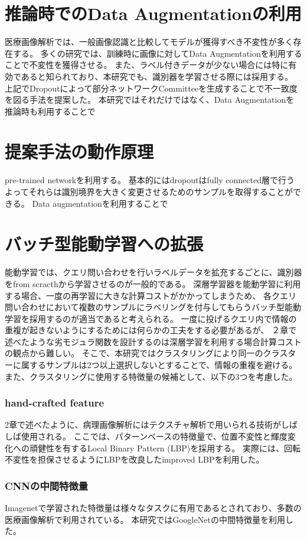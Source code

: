 \section{推論時でのData Augmentationの利用}
医療画像解析では、一般画像認識と比較してモデルが獲得すべき不変性が多く存在する。
多くの研究では、訓練時に画像に対してData Augmentationを利用することで不変性を獲得させる。
また、ラベル付きデータが少ない場合には特に有効であると知られており、本研究でも、識別器を学習させる際には採用する。
上記でDropoutによって部分ネットワークCommitteeを生成することで不一致度を図る手法を提案した。
本研究ではそれだけではなく、Data Augmentationを推論時も利用することで

\section{提案手法の動作原理}
pre-trained networkを利用する。
基本的にはdropoutはfully connected層で行う
よってそれらは識別境界を大きく変更させるためのサンプルを取得することができる。
Data augmentationを利用することで

\section{バッチ型能動学習への拡張}
能動学習では、クエリ問い合わせを行いラベルデータを拡充するごとに、識別器をfrom scracthから学習させるのが一般的である。
深層学習器を能動学習に利用する場合、一度の再学習に大きな計算コストがかかってしまうため、
各クエリ問い合わせにおいて複数のサンプルにラベリングを付与してもらうバッチ型能動学習を採用するのが適当であると考えられる。
一度に投げるクエリ内で情報の重複が起きないようにするためには何らかの工夫をする必要があるが、
２章で述べたような劣モジュラ関数を設計するのは深層学習を利用する場合計算コストの観点から難しい。
そこで、本研究ではクラスタリングにより同一のクラスターに属するサンプルは2つ以上選択しないとすることで、情報の重複を避ける。
また、クラスタリングに使用する特徴量の候補として、以下の3つを考慮した。

\subsubsection{hand-crafted feature}
2章で述べたように、病理画像解析にはテクスチャ解析で用いられる技術がしばしば使用される。
ここでは、パターンベースの特徴量で、位置不変性と輝度変化への頑健性を有するLocal Binary Pattern (LBP)を採用する。
実際には、回転不変性を担保させるようにLBPを改良したimproved LBPを利用した。

\subsubsection{CNNの中間特徴量}
Imagenetで学習された特徴量は様々なタスクに有用であるとされており、多数の医療画像解析で利用されている。
本研究ではGoogleNetの中間特徴量を利用した。

